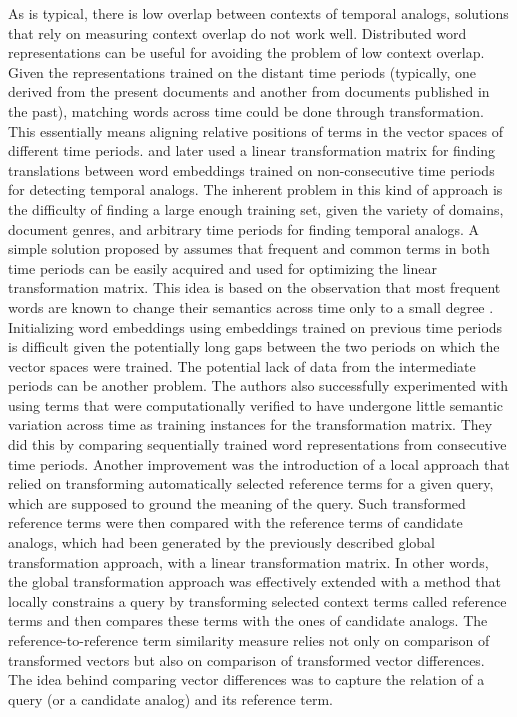 \documentclass[output=paper]{langsci/langscibook}
\begin{document}
As is typical, there is low overlap between contexts of temporal analogs, solutions that rely on measuring context overlap do not work well. Distributed word representations \citep[e.g.,][]{mikolov2013-distributed} 
can be useful for avoiding the problem of low context overlap. Given the representations trained on the distant time periods (typically, one derived from the present documents and another from documents published in the past), matching words across time could be done through transformation. This essentially means aligning relative positions of terms in the vector spaces of different time periods. \citet{zhang2016past} and later \citet{szymanski:2017} 
used a linear transformation matrix for finding translations between word embeddings trained on non-consecutive time periods for detecting temporal analogs. The inherent problem in this kind of approach is the difficulty of finding a large enough training set, given the variety of domains, document genres, and arbitrary time periods for finding temporal analogs. 
A simple solution proposed by \citet{zhang2016past} assumes that frequent and common terms in both time periods can be easily acquired and used for optimizing the linear transformation matrix. This idea is based on the observation that most frequent words are known to change their semantics across time only to a small degree \citep{hamilton-etal-2016-diachronic,pagel2007frequency,lieberman2007quantifying}. Initializing word embeddings using embeddings trained on previous time periods \citep{kim-etal-2014-temporal} is difficult given the potentially long gaps between the two periods on which the vector spaces were trained. The potential lack of data from the intermediate periods can be another problem.
The authors also successfully experimented with using terms that were computationally verified to have undergone little semantic variation across time as training instances for the transformation matrix. They did this by comparing sequentially trained word representations from consecutive time periods. Another improvement was the introduction of a local approach that relied on transforming automatically selected reference terms for a given query, which are supposed to ground the meaning of the query. Such transformed reference terms were then compared with the reference terms of candidate analogs, which had been generated by the previously described global transformation approach, with a linear transformation matrix. In other words, the global transformation approach was effectively extended with a method that locally constrains a query by transforming selected context terms called reference terms and then compares these terms with the ones of candidate analogs. The reference-to-reference term similarity measure relies not only on comparison of transformed vectors but also on comparison of transformed vector differences. The idea behind comparing vector differences was to capture the relation of a query (or a candidate analog) and its reference term.
\end{document}
